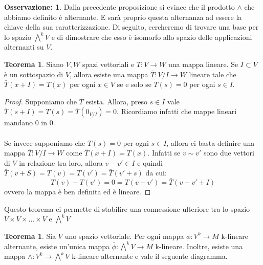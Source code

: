 \documentclass[12pt,a4paper]{report}
\theoremstyle{definition}
\theoremstyle{Theorem}
\newtheorem{Theo}[Def]{Teorema}
\theoremstyle{definition}
\theoremstyle{definition}
\theoremstyle{definition}
\newtheorem{Obs}[Def]{Osservazione:}
\begin{document}
\begin{Obs}
	Dalla precedente proposizione si evince che il prodotto $\wedge$ che abbiamo definito è alternante. E sarà proprio questa alternanza ad essere la chiave della sua caratterizzazione. Di seguito, cercheremo di trovare una base per lo spazio $\bigwedge^kV$ e di dimostrare che esso è isomorfo allo spazio delle applicazioni alternanti su $V$.
\end{Obs}
\begin{Theo} \label{Theo 1}
	Siano $V,W$ spazi vettoriali e $T:V\rightarrow W$ una mappa lineare. Se $I\subset V$ è un sottospazio di $V$, allora esiste una mappa $\bar{T}:V/I\rightarrow W$ lineare tale che $\bar{T}(x+I)=T(x)$ per ogni $x\in V$ se e solo se $T(s)=0$ per ogni $s\in I$.
\end{Theo}
\begin{proof}
	Supponiamo che $\bar{T}$ esista. Allora, preso $s\in I$ vale $\bar{T}(s+I)=T(s)=\bar{T}(0_{V/I})=0$. Ricordiamo infatti che mappe lineari mandano 0 in 0.\\
	\\
	Se invece supponiamo che $T(s)=0$ per ogni $s\in I$, allora ci basta definire una mappa $\bar{T}:V/I\rightarrow W$ come $\bar{T}(x+I)=T(x)$. Infatti se $v\sim v'$ sono due vettori di $V$ in relazione tra loro, allora $v-v'\in I$ e quindi $\bar{T}(v+S)=T(v)=T(v')=\bar{T}(v'+s)$ da cui:
	$$T(v)-T(v')=0=T(v-v')=\bar{T}(v-v'+I)$$ ovvero la mappa è ben definita ed è lineare.
\end{proof}
Questo teorema ci permette di stabilire una connessione ulteriore tra lo spazio $V\times V\times...\times V$ e $\bigwedge^kV$
\begin{Theo}
	Sia $V$ uno spazio vettoriale. Per ogni mappa $\phi:V^k\rightarrow M$ k-lineare alternante, esiste un'unica mappa $\bar{\phi}:\bigwedge^kV\rightarrow M$ k-lineare. Inoltre, esiste una mappa $\wedge:V^k\rightarrow\bigwedge^kV$ k-lineare alternante e vale il seguente diagramma.
\end{Theo}
\begin{center}
\end{center}
\end{document}
